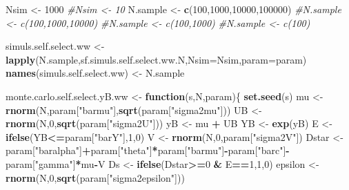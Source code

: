 \documentclass[]{book}
\newenvironment{Shaded}{\begin{snugshade}}{\end{snugshade}}
\newcommand{\CommentTok}[1]{\textcolor[rgb]{0.56,0.35,0.01}{\textit{#1}}}
\newcommand{\ControlFlowTok}[1]{\textcolor[rgb]{0.13,0.29,0.53}{\textbf{#1}}}
\newcommand{\DataTypeTok}[1]{\textcolor[rgb]{0.13,0.29,0.53}{#1}}
\newcommand{\DecValTok}[1]{\textcolor[rgb]{0.00,0.00,0.81}{#1}}
\newcommand{\KeywordTok}[1]{\textcolor[rgb]{0.13,0.29,0.53}{\textbf{#1}}}
\newcommand{\NormalTok}[1]{#1}
\newcommand{\OperatorTok}[1]{\textcolor[rgb]{0.81,0.36,0.00}{\textbf{#1}}}
\newcommand{\StringTok}[1]{\textcolor[rgb]{0.31,0.60,0.02}{#1}}
\theoremstyle{definition}
\theoremstyle{definition}
\theoremstyle{definition}
\theoremstyle{remark}
\begin{document}
\begin{Shaded}
\begin{Highlighting}[]
\NormalTok{Nsim <-}\StringTok{ }\DecValTok{1000}
\CommentTok{#Nsim <- 10}
\NormalTok{N.sample <-}\StringTok{ }\KeywordTok{c}\NormalTok{(}\DecValTok{100}\NormalTok{,}\DecValTok{1000}\NormalTok{,}\DecValTok{10000}\NormalTok{,}\DecValTok{100000}\NormalTok{)}
\CommentTok{#N.sample <- c(100,1000,10000)}
\CommentTok{#N.sample <- c(100,1000)}
\CommentTok{#N.sample <- c(100)}

\NormalTok{simuls.self.select.ww <-}\StringTok{ }\KeywordTok{lapply}\NormalTok{(N.sample,sf.simuls.self.select.ww.N,}\DataTypeTok{Nsim=}\NormalTok{Nsim,}\DataTypeTok{param=}\NormalTok{param)}
\KeywordTok{names}\NormalTok{(simuls.self.select.ww) <-}\StringTok{ }\NormalTok{N.sample}
\end{Highlighting}
\end{Shaded}

\begin{Shaded}
\begin{Highlighting}[]
\NormalTok{monte.carlo.self.select.yB.ww <-}\StringTok{ }\ControlFlowTok{function}\NormalTok{(s,N,param)\{}
  \KeywordTok{set.seed}\NormalTok{(s)}
\NormalTok{  mu <-}\StringTok{ }\KeywordTok{rnorm}\NormalTok{(N,param[}\StringTok{"barmu"}\NormalTok{],}\KeywordTok{sqrt}\NormalTok{(param[}\StringTok{"sigma2mu"}\NormalTok{]))}
\NormalTok{  UB <-}\StringTok{ }\KeywordTok{rnorm}\NormalTok{(N,}\DecValTok{0}\NormalTok{,}\KeywordTok{sqrt}\NormalTok{(param[}\StringTok{"sigma2U"}\NormalTok{]))}
\NormalTok{  yB <-}\StringTok{ }\NormalTok{mu }\OperatorTok{+}\StringTok{ }\NormalTok{UB }
\NormalTok{  YB <-}\StringTok{ }\KeywordTok{exp}\NormalTok{(yB)}
\NormalTok{  E <-}\StringTok{ }\KeywordTok{ifelse}\NormalTok{(YB}\OperatorTok{<=}\NormalTok{param[}\StringTok{"barY"}\NormalTok{],}\DecValTok{1}\NormalTok{,}\DecValTok{0}\NormalTok{)}
\NormalTok{  V <-}\StringTok{ }\KeywordTok{rnorm}\NormalTok{(N,}\DecValTok{0}\NormalTok{,param[}\StringTok{"sigma2V"}\NormalTok{])}
\NormalTok{  Dstar <-}\StringTok{ }\NormalTok{param[}\StringTok{"baralpha"}\NormalTok{]}\OperatorTok{+}\NormalTok{param[}\StringTok{"theta"}\NormalTok{]}\OperatorTok{*}\NormalTok{param[}\StringTok{"barmu"}\NormalTok{]}\OperatorTok{-}\NormalTok{param[}\StringTok{"barc"}\NormalTok{]}\OperatorTok{-}\NormalTok{param[}\StringTok{"gamma"}\NormalTok{]}\OperatorTok{*}\NormalTok{mu}\OperatorTok{-}\NormalTok{V}
\NormalTok{  Ds <-}\StringTok{ }\KeywordTok{ifelse}\NormalTok{(Dstar}\OperatorTok{>=}\DecValTok{0} \OperatorTok{&}\StringTok{ }\NormalTok{E}\OperatorTok{==}\DecValTok{1}\NormalTok{,}\DecValTok{1}\NormalTok{,}\DecValTok{0}\NormalTok{)}
\NormalTok{  epsilon <-}\StringTok{ }\KeywordTok{rnorm}\NormalTok{(N,}\DecValTok{0}\NormalTok{,}\KeywordTok{sqrt}\NormalTok{(param[}\StringTok{"sigma2epsilon"}\NormalTok{]))}

\end{Highlighting}
\end{Shaded}
\end{document}
